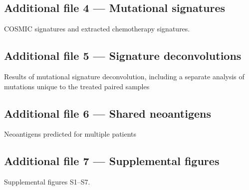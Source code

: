 \documentclass[linenumbers]{bmcart}
\begin{document}
\begin{backmatter}
  \subsection*{Additional file 4 --- Mutational signatures}
    COSMIC signatures and extracted chemotherapy signatures.
    
  \subsection*{Additional file 5 --- Signature deconvolutions}
    Results of mutational signature deconvolution, including a separate analysis of mutations unique to the treated paired samples
    
  \subsection*{Additional file 6 --- Shared neoantigens}
    Neoantigens predicted for multiple patients
    
  \subsection*{Additional file 7 --- Supplemental figures}
    Supplemental figures S1--S7.
    
\end{backmatter}
\end{document}
